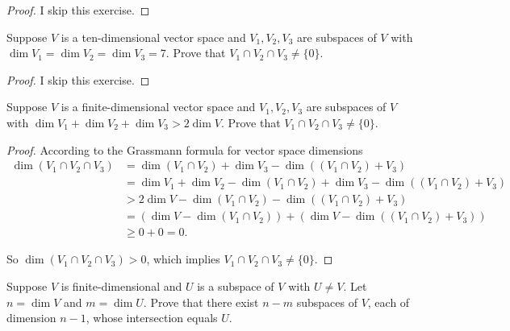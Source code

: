 \begin{proof}
    I skip this exercise.
\end{proof}

\begin{exercise}
    Suppose $V$ is a ten-dimensional vector space and $V_{1} , V_{2} , V_{3}$ are subspaces of $V$ with $\dim V_{1} = \dim V_{2} = \dim V_{3} = 7$. Prove that $V_{1} \cap V_{2} \cap V_{3} \ne \{0\}$.
\end{exercise}

\begin{proof}
    I skip this exercise.
\end{proof}

\begin{exercise}
    Suppose $V$ is a finite-dimensional vector space and $V_{1} , V_{2} , V_{3}$ are subspaces of $V$ with $\dim V_{1} + \dim V_{2} + \dim V_{3} > 2\dim V$. Prove that $V_{1} \cap V_{2} \cap V_{3} \ne \{0\}$.
\end{exercise}

\begin{proof}
    According to the Grassmann formula for vector space dimensions
    \begin{align*}
        \dim (V_{1}\cap V_{2}\cap V_{3}) & = \dim (V_{1} \cap V_{2}) + \dim V_{3} - \dim ((V_{1}\cap V_{2}) + V_{3})                          \\
                                         & = \dim V_{1} + \dim V_{2} - \dim (V_{1}\cap V_{2}) + \dim V_{3} - \dim ((V_{1}\cap V_{2}) + V_{3}) \\
                                         & > 2\dim V - \dim (V_{1}\cap V_{2}) - \dim((V_{1}\cap V_{2}) + V_{3})                               \\
                                         & = (\dim V - \dim (V_{1}\cap V_{2})) + (\dim V - \dim((V_{1}\cap V_{2}) + V_{3}))                   \\
                                         & \geq 0 + 0 = 0.
    \end{align*}

    So $\dim (V_{1}\cap V_{2}\cap V_{3}) > 0$, which implies $V_{1}\cap V_{2}\cap V_{3}\ne \{0\}$.
\end{proof}

\begin{exercise}
    Suppose $V$ is finite-dimensional and $U$ is a subspace of $V$ with $U \ne V$. Let $n = \dim V$ and $m = \dim U$. Prove that there exist $n - m$ subspaces of $V$, each of dimension $n - 1$, whose intersection equals $U$.
\end{exercise}


